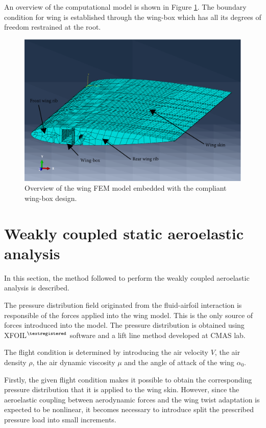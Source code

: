     An overview of the computational model is shown in Figure \ref{fig:wing}. The boundary condition for wing is established through the wing-box which has all its degrees of freedom restrained at the root.

    \begin{figure}[!htpb]
      \centering
      \includegraphics[width=0.7 \textwidth]{figures/wing-model/wing}
      \caption[Overview of the wing FEM model embedded with the compliant wing-box design]{Overview of the wing FEM model embedded with the compliant wing-box design.}
      \label{fig:wing}
    \end{figure}

  \clearpage
  \section{Weakly coupled static aeroelastic analysis} \label{sec:aeroelastic_aeroelastic}

    In this section, the method followed to perform the weakly coupled aeroelastic analysis is described. 

    The pressure distribution field originated from the fluid-airfoil interaction is responsible of the forces applied into the wing model. This is the only source of forces introduced into the model. The pressure distribution is obtained using XFOIL$^{\textregistered}$ software and a lift line method developed at CMAS lab.

    The flight condition is determined by introducing the air velocity $V$, the air density $\rho$, the air dynamic viscosity $\mu$ and the angle of attack of the wing $\alpha_0$.

    Firstly, the given flight condition makes it possible to obtain the corresponding pressure distribution that it is applied to the wing skin. However, since the aeroelastic coupling between aerodynamic forces and the wing twist adaptation is expected to be nonlinear, it becomes necessary to introduce split the prescribed pressure load into small increments.

